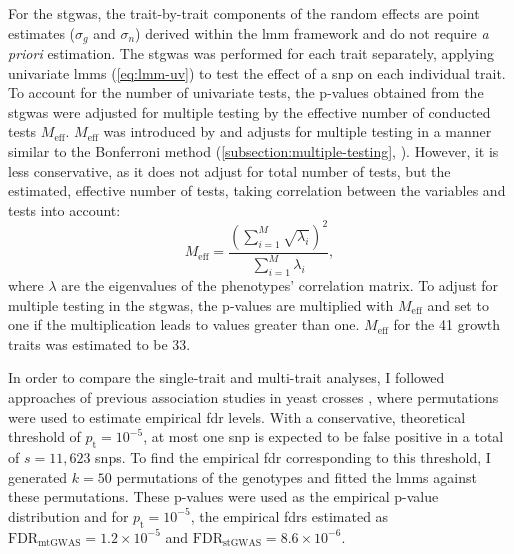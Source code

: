 For the \gls{stgwas}, the trait-by-trait components of the random effects are point estimates (\(\sigma_g\) and \(\sigma_n\)) derived within the \gls{lmm} framework and do not require \textit{a priori} estimation. The \gls{stgwas} was performed for each trait separately, applying univariate \glspl{lmm} (\cref{eq:lmm-uv}) to test the effect of a \gls{snp} on each individual trait. To account for the number of univariate tests, the p-values obtained from the \gls{stgwas} were adjusted for multiple testing by the effective number of conducted tests \(M_\text{eff}\). \(M_\text{eff}\) was introduced by \citet{Galwey2009} and adjusts for multiple testing in a manner similar to the Bonferroni method (\cref{subsection:multiple-testing}, \citep{Dunn1961}). However, it is less conservative, as it does not adjust for total number of tests, but the estimated, effective number of tests, taking correlation between the 
variables and tests into account:
\begin{equation}
 M_\text{eff} = \frac{(\sum^M_{i=1} \sqrt{\lambda_i})^2}{\sum^M_{i=1}\lambda_i},
 \label{eq:meff}
\end{equation}
 where \(\lambda\) are the eigenvalues of the phenotypes' correlation matrix. To adjust for multiple testing in the \gls{stgwas}, the p-values are multiplied with \(M_\text{eff}\) and set to one if the multiplication leads to values greater than one. \(M_\text{eff}\) for the \num{41} growth traits was estimated to be \num{33}. 
 
In order to compare the single-trait and multi-trait analyses, I followed approaches of previous association studies in yeast crosses \citep{Brem2002,Brem2005,Ehrenreich2010}, where permutations were used to estimate empirical  \gls{fdr} levels. With a conservative, theoretical threshold of \(p_\text{t}=10^{-5}\), at most one \gls{snp} is expected to be false positive in a total of \(s = 11,623\) \glspl{snp}. To find the empirical \gls{fdr} corresponding to this threshold, I generated \(k = 50\) permutations of the genotypes and fitted the \glspl{lmm} against these permutations. These p-values were used as the empirical p-value distribution and for \(p_\text{t}=10^{-5}\), the empirical \glspl{fdr} estimated as 
\(\text{FDR}_{\text{mtGWAS}} =1.2 \times 10^{-5}\) and \(\text{FDR}_{\text{stGWAS}} =8.6 \times 10^{-6}\).

